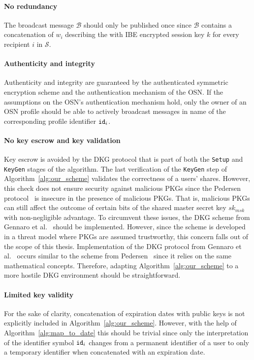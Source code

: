 \paragraph{No redundancy} The broadcast message $\mathcal{B}$ should only be published once since $\mathcal{B}$ contains a concatenation of $w_i$ describing the with IBE encrypted session key $k$ for every recipient $i$ in $\mathcal{S}$.

\paragraph{Authenticity and integrity} Authenticity and integrity are guaranteed by the authenticated symmetric encryption scheme and the authentication mechanism of the OSN. If the assumptions on the OSN's authentication mechanism hold, only the owner of an OSN profile should be able to actively broadcast messages in name of the corresponding profile identifier $\mathtt{id}_{i}$.

\paragraph{No key escrow and key validation} Key escrow is avoided by the DKG protocol that is part of both the \texttt{Setup} and \texttt{KeyGen} stages of the algorithm. 
The last verification of the \texttt{KeyGen} step of Algorithm~\ref{alg:our_scheme} validates the correctness of a users' shares. However, this check does not ensure security against malicious PKGs since the Pedersen protocol~\cite{art:Pedersen91a} is insecure in the presence of malicious PKGs. That is, malicious PKGs can still affect the outcome of certain bits of the shared master secret key $sk_{msk}$ with non-negligible advantage. To circumvent these issues, the DKG scheme from Gennaro et al.~\cite{art:GennaroJKR07} should be implemented. However, since the scheme is developed in a threat model where PKGs are assumed trustworthy, this concern falls out of the scope of this thesis. Implementation of the DKG protocol from Gennaro et al.~\cite{art:GennaroJKR07} occurs similar to the scheme from Pedersen~\cite{art:Pedersen91a} since it relies on the same mathematical concepts. Therefore, adapting Algorithm~\ref{alg:our_scheme} to a more hostile DKG environment should be straightforward.

\paragraph{Limited key validity} For the sake of clarity, concatenation of expiration dates with public keys is not explicitly included in Algorithm~\ref{alg:our_scheme}. However, with the help of Algorithm~\ref{alg:map_to_date} this should be trivial since only the interpretation of the identifier symbol $\mathtt{id}_{i}$ changes from a permanent identifier of a user to only a temporary identifier when concatenated with an expiration date.

